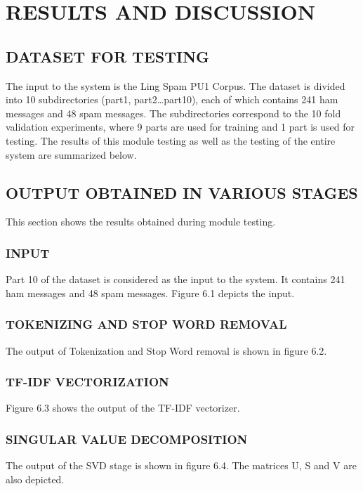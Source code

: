 
\chapter{RESULTS AND DISCUSSION} %

\section{DATASET FOR TESTING} 
The input to the system is the Ling Spam PU1 Corpus. The dataset is divided into 10 subdirectories (part1, part2…part10), each of which contains 241 ham messages and 48 spam messages. The subdirectories correspond to the 10 fold validation experiments, where 9 parts are used for training and 1 part is used for testing.  The results of this module testing as well as the testing of the entire system are summarized below. 

\section{OUTPUT OBTAINED IN VARIOUS STAGES} 
This section shows the results obtained during module testing.

\subsection{INPUT}
Part 10 of the dataset is considered as the input to the system. It contains 241 ham messages and 48 spam messages. Figure 6.1 depicts the input.

\subsection{TOKENIZING AND STOP WORD REMOVAL}
The output of Tokenization and Stop Word removal is shown in figure 6.2.

\subsection{TF-IDF VECTORIZATION}
Figure 6.3 shows the output of the TF-IDF vectorizer.

\subsection{SINGULAR VALUE DECOMPOSITION}
The output of the SVD stage is shown in figure 6.4. The matrices U, S and V are also depicted.



